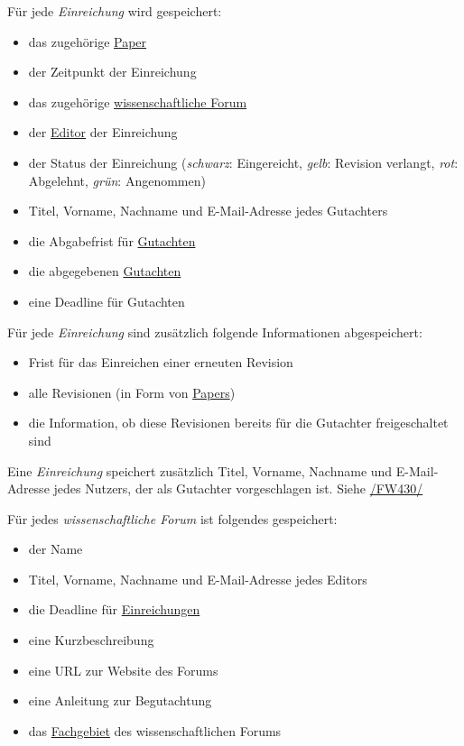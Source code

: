 \begin{description}
	 Für jede \emph{Einreichung} wird gespeichert:
	\begin{itemize}
		\item das zugehörige \hyperref[d020]{Paper}
		\item der Zeitpunkt der Einreichung
		\item das zugehörige \hyperref[d030]{wissenschaftliche Forum}
		\item der \hyperref[funkt:editor]{Editor} der Einreichung
		\item der Status der Einreichung (\emph{schwarz}: Eingereicht, \emph{gelb}: Revision verlangt, \emph{rot}: Abgelehnt, \emph{grün}: Angenommen)
		\item Titel, Vorname, Nachname und E-Mail-Adresse jedes Gutachters
		\item die Abgabefrist für \hyperref[d040]{Gutachten}
		\item die abgegebenen \hyperref[d040]{Gutachten}
		\item eine Deadline für Gutachten
	\end{itemize}

	 Für jede \emph{Einreichung} sind zusätzlich folgende Informationen abgespeichert:
	\begin{itemize}
		\item Frist für das Einreichen einer erneuten Revision
		\item alle Revisionen (in Form von \hyperref[d020]{Papers})
		\item die Information, ob diese Revisionen bereits für die Gutachter freigeschaltet sind
	\end{itemize}

	 Eine \emph{Einreichung} speichert zusätzlich Titel, Vorname, Nachname und E-Mail-Adresse jedes Nutzers, der als Gutachter vorgeschlagen ist.
	Siehe \hyperref[funkt:430]{/FW430/}

	 Für jedes \emph{wissenschaftliche Forum} ist folgendes gespeichert:
	\begin{itemize}
		\item der Name
		\item Titel, Vorname, Nachname und E-Mail-Adresse jedes Editors
		\item die Deadline für \hyperref[d025]{Einreichungen}
		\item eine Kurzbeschreibung
		\item eine URL zur Website des Forums
		\item eine Anleitung zur Begutachtung
		\item das \hyperref[d035]{Fachgebiet} des wissenschaftlichen Forums
	\end{itemize}


\end{description}
